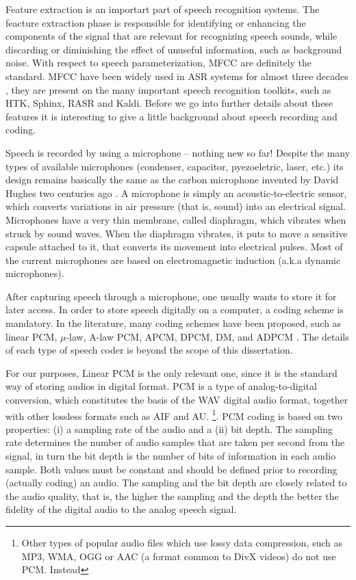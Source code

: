 Feature extraction is an importart part of speech recognition systems. The feacture extraction 
phase is responsible for identifying or enhancing the components of the signal that are relevant 
for recognizing speech sounds, while discarding or diminishing the effect of unuseful information, 
such as background noise. With respect to speech parameterization, \ac{MFCC} are definitely the
standard. \ac{MFCC} have been widely used in \ac{ASR} systems for almost three decades \cite{Davis1980}, 
they are present on the many important speech recognition toolkits, such as \ac{HTK}, Sphinx, \ac{RASR} and Kaldi.
Before we go into further details about these features it is interesting to give a little background 
about speech recording and coding.

Speech is recorded by using a microphone -- nothing new so far!
Despite the many types of available microphones (condenser, capacitor, pyezoeletric, laser, etc.) its design
remains basically the same as the carbon microphone invented by David Hughes two centuries ago \cite{Robjohns2010}.
A microphone is simply an acoustic-to-electric sensor, which converts variations in air pressure (that is, sound)
into an electrical signal. Microphones have a very thin membrane, called diaphragm, which vibrates when struck by 
sound waves.  When the diaphragm vibrates, it puts to move a sensitive capsule attached to it, 
that converts its movement into electrical pulses. Most of the current microphones are based on electromagnetic induction (a.k.a dynamic microphones).

After capturing speech through a microphone, one usually wants to store it for later access. In order
to store speech digitally on a computer, a coding scheme is mandatory. In the literature, many coding schemes have
been proposed, such as linear PCM, $\mu$-law, A-law PCM, APCM, DPCM, DM, and ADPCM \cite{Huang2001}. The details of 
each type of speech coder is beyond the scope of this dissertation. 

For our purposes, Linear PCM is the only relevant one, since it is the standard way of storing audios in digital format. \ac{PCM} is a type of analog-to-digital conversion, which constitutes the basis of the WAV digital audio format, together
with other lossless formats such as AIF and AU.
\footnote{Other types of popular audio files which use lossy data compression, such as MP3, WMA, OGG or AAC (a format common to 
DivX videos) do not use PCM. Instead}. 
PCM coding is based on two properties: (i) a sampling rate of the audio and a (ii) bit depth. The sampling rate determines the
number of audio samples that are taken per second from the signal, in turn the bit depth is the number of bits 
of information in each audio sample. Both values must be constant and should be defined prior to recording (actually coding) an audio. 
The sampling and the bit depth are closely related to the audio quality, that is, the higher the sampling and the depth
the better the fidelity of the digital audio to the analog speech signal.


